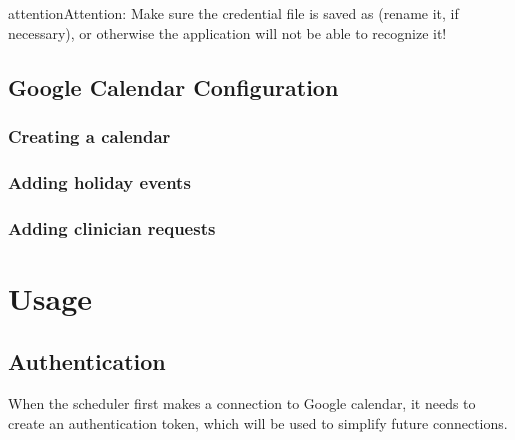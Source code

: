 \documentclass[letterpaper,10pt,english]{sphinxmanual}
\begin{document}
\begin{DUlineblock}{0em}
\item[] 
\end{DUlineblock}

\begin{sphinxadmonition}{attention}{Attention:}
Make sure the credential file is saved as  (rename it, if necessary),
or otherwise the application will not be able to recognize it!
\end{sphinxadmonition}


\section{Google Calendar Configuration}
\label{\detokenize{index:google-calendar-configuration}}

\subsection{Creating a calendar}
\label{\detokenize{index:creating-a-calendar}}

\subsection{Adding holiday events}
\label{\detokenize{index:adding-holiday-events}}

\subsection{Adding clinician requests}
\label{\detokenize{index:adding-clinician-requests}}\label{\detokenize{index:id1}}

\chapter{Usage}
\label{\detokenize{index:usage}}

\section{Authentication}
\label{\detokenize{index:authentication}}\label{\detokenize{index:id2}}
When the scheduler first makes a connection to Google calendar, it needs
to create an authentication token, which will be used to simplify future
connections.
\end{document}
